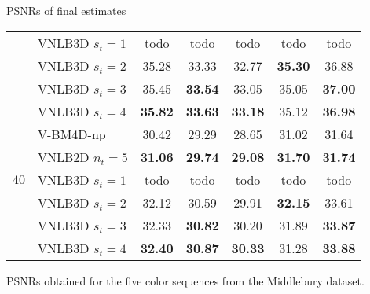\documentclass[mathserif, 8pt]{beamer}
\newcommand{\best}[1]{\textbf{\textcolor{MyOrange}{#1}}}
\newcommand{\Best}[1]{\textbf{\textcolor{MyOrangeBrighter}{#1}}}
\begin{document}
\begin{frame}{PSNRs of final estimates}
\begin{center}
{\begin{tabular}{ c | l |c c c c c}
		                      & VNLB3D $s_t = 1$ &       todo   &       todo   &       todo   &       todo   &       todo   \\
		                      & VNLB3D $s_t = 2$ &       35.28  &       33.33  &       32.77  & \best{35.30} &       36.88  \\
		                      & VNLB3D $s_t = 3$ &       35.45  & \Best{33.54} &       33.05  &       35.05  & \Best{37.00} \\
		                      & VNLB3D $s_t = 4$ & \Best{35.82} & \Best{33.63} & \Best{33.18} &       35.12  & \Best{36.98} \\\hline
%
		\multirow{5}{*}{$40$} & V-BM4D-np        &       30.42  &       29.29  &       28.65  &       31.02  &       31.64  \\
		                      & VNLB2D $n_t = 5$ & \best{31.06} & \best{29.74} & \best{29.08} & \best{31.70} & \best{31.74} \\
		                      & VNLB3D $s_t = 1$ &       todo   &       todo   &       todo   &       todo   &       todo   \\
		                      & VNLB3D $s_t = 2$ &       32.12  &       30.59  &       29.91  & \Best{32.15} &       33.61  \\
		                      & VNLB3D $s_t = 3$ &       32.33  & \Best{30.82} &       30.20  &       31.89  & \Best{33.87} \\
		                      & VNLB3D $s_t = 4$ & \Best{32.40} & \Best{30.87} & \Best{30.33} &       31.28  & \Best{33.88} \\\hline
%
		\end{tabular}}

	\bigskip
	
	PSNRs obtained for the five color sequences from the Middlebury dataset.

	\end{center}






\end{frame}
\end{document}
